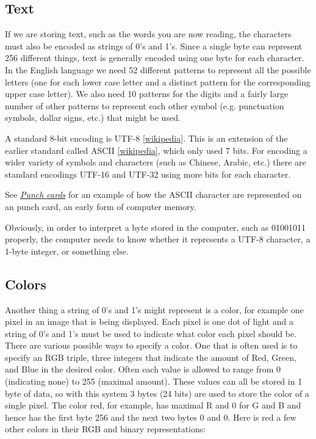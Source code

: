 \documentclass[letterpaper,10pt,english]{sphinxmanual}
\begin{document}
\subsection{Text}
\label{memory:text}
If we are storing text, such as the words you are now reading, the
characters must also be encoded as strings of 0's and 1's.  Since a single
byte can represent 256 different things, text is generally encoded using one
byte for each character.  In the English language we need 52 different
patterns to represent all the possible letters (one for each lower case
letter and a distinct pattern for the corresponding upper case letter).  We
also need 10 patterns for the digits and a fairly large number of other
patterns to represent each other symbol (e.g. punctuation symbols, dollar
signs, etc.) that might be used.

A standard 8-bit encoding is UTF-8
\href{http://en.wikipedia.org/wiki/UTF-8}{{[}wikipedia{]}}.
This is an extension of the earlier standard called ASCII
\href{http://en.wikipedia.org/wiki/ASCII}{{[}wikipedia{]}}, which only used 7 bits.
For encoding a wider variety of symbols and characters (such as
Chinese, Arabic, etc.) there are standard encodings UTF-16 and
UTF-32 using more bits for each character.

See {\hyperref[punchcard:punchcard]{\emph{Punch cards}}} for an example of how the ASCII character are
represented on an punch card, an early form of computer memory.

Obviously, in order to interpret a byte stored in the computer, such as
01001011 properly, the computer needs to know whether it represents a UTF-8
character, a 1-byte integer, or something else.


\subsection{Colors}
\label{memory:colors}\label{memory:id5}
Another thing a string of 0's and 1's
might represent is a color, for example one pixel in an image that is
being displayed.  Each pixel is one dot of light and a string of 0's and 1's
must be used to indicate what color each pixel should be.  There are various
possible ways to specify a color.  One that is often used is to specify an
RGB triple, three integers that indicate the amount of Red, Green, and Blue
in the desired color.  Often each value is allowed to range from 0
(indicating none) to 255 (maximal amount). These values can all be stored in
1 byte of data, so with this system 3 bytes (24 bits) are used to store the
color of a single pixel.  The color red, for example, has maximal R and 0
for G and B and hence has the first byte 256 and the next two bytes 0 and 0.
Here is red a few other colors in their RGB and binary representations:
\end{document}
